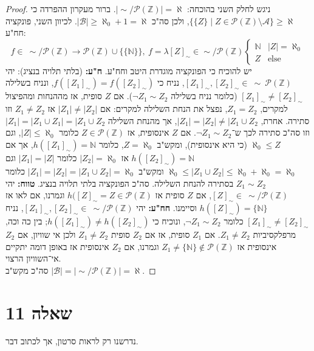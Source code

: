 \documentclass[]{article}
\newcommand\N     {\mathbb{N}}
\newcommand\Z     {\mathbb{Z}}
\newcommand\ps    {\mathcal{P}}
\newcommand\ac    {\mathcal{A}}
\newcommand\bc    {\mathcal{B}}
\newcommand\other {\text{else}}
\newcommand\az    {\aleph_0}
\newcommand\al    {\aleph}
\begin{document}
\begin{enumerate}[(a)]
\begin{proof}
			ניגש לחלק השני בהוכחה: $ |\sim / \ps(\Z)| = \al $. ברור מעקרון ההפרדה כי $ \{\{Z\} \mid Z \in \ps(\Z) \setminus \ac\} \ge \al $, ולכן סה"כ $ |\bc| \ge \az + 1 = \al $. לכיוון השני, פונקציה חח"ע: 
			\[ f \in \ \sim / \ps(\Z) \to \ps(\Z) \cup \{\{\N\}\}, \ f = \lambda [Z]_\sim \in \sim / \ps(\Z) \begin{cases}
				\N & |Z| = \az \\
				Z & \other
			\end{cases} \]
			יש להוכיח כי הפונקציה מוגדרת היטב וחח"ע. \textbf{ח"ע: } (בלתי תלויה בנציג): יהי $ [Z_1]_\sim, [Z_2]_\sim \in \ \sim \ \ps(\Z) $, נניח כי $ f([Z_1]_\sim) = f([Z_2]_\sim) $, ונניח בשלילה $ [Z_1]_\sim \neq [Z_2]_\sim $ (כלומר נניח בשלילה $ \lnot Z_1 \sim Z_2 $). אם $ Z $ סופית, אז מההנחות ומהפיצול למקרים, $ Z_1 = Z_2 $, נפצל את הנחת השלילה למקרים: אם $ |Z_1| \neq |Z_2| $ אז $ Z_1 \neq Z_2 $ וזו סתירה. אחרת, $ |Z_1| = |Z_2| \neq |Z_1 \cup Z_2 $, אך מהנחת השלילה $ |Z_1| = |Z_1 \cup Z_1| = |Z_1 \cup Z_2 $ וזו סה"כ סתירה לכך ש־$ \lnot Z_1 \sim Z_2 $. אם $ Z $ אינסופית, אז $ Z \in \ps(\Z) $ כלומר $ |Z| \le \az $, וגם $ \az \le Z $ (כי היא אינסופית), ומקש"ב $ Z = \az $, כלומר $ h([Z_1]_\sim) = \N $, אך אם $ h([Z_2]_\sim) = \N $ אז $ |Z_2| = \az $ כלומר $ |Z_1| = |Z| $ וגם $ \az \le |Z_1 \cup Z_2| \le \az + \az = \az $ ומקש"ב $ |Z_1| = |Z_2| = |Z_1 \cup Z_2| = \az $ כלומר $ Z_1 \sim Z_2 $ בסתירה להנחת השלילה. סה"כ הפונקציה בלתי תלויה בנציג. \textbf{טווח: }יהי $ [Z]_\sim \in \ \sim / \ps(\Z) $, אם $ Z $ סופית אז $ h([Z]_\sim = Z \in \ps(\Z) $ וגמרנו, אם לאו אז $ h([Z]_\sim) = \{\N\} $ וסיימנו. \textbf{חח"ע: }יהי $ [Z_1]_\sim, [Z_2]_\sim \in \ \sim / \ps(\Z) $, נניח $ [Z_1]_\sim \neq [Z_2]_\sim $ כלומר $ \lnot Z_1 \sim Z_2 $, ונוכיח כי $ h([Z_1]_\sim) \neq h([Z_2]_\sim) $; בין כה וכה, מרפלקסיביות $ Z_1 \neq Z_2 $. אם $ Z_1 $ סופית, אז אם $ Z_2 $ סופית $ Z_1 \neq Z_2 $ ולכן אי שוויון, אם $ Z_2 $ אינסופית אז $ Z_1 \neq \{\N\} \not\in \ps(\Z) $ וגמרנו, אם $ Z_2 $ אינסופית אז באופן דומה יתקיים אי־השוויון הרצוי. \\
			סה"כ מקש"ב $ |\bc| = |\sim / \ps(\Z)| = \al $. 
		\end{proof}
	\end{enumerate}
	\section*{שאלה 11}
	נדרשנו רק לראות סרטון, אך לכתוב דבר. 
\end{document}
